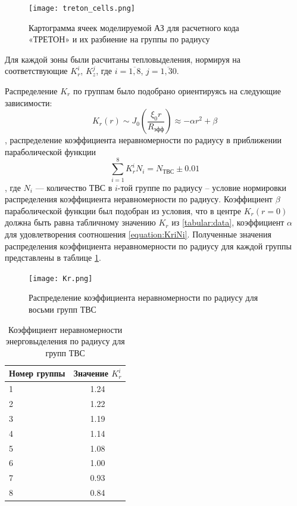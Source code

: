 \begin{figure}[H]
	\begin{center}
		\texttt{[image: treton\_cells.png]}
		\caption{Картограмма ячеек моделируемой АЗ для расчетного кода «ТРЕТОН» и их разбиение на группы по радиусу}
		\label{pic:treton-kartogramma}
	\end{center}
\end{figure}


Для каждой зоны были расчитаны тепловыделения, нормируя на соответствующие $K_r^i$, $K_z^j$, где $i = \overline{1, 8}$, $j = \overline {1, 30}$.

Распределение $K_r$ по группам было подобрано ориентируясь на следующие зависимости:
\begin{equation}
    K_r(r) \sim J_0(\frac{\xi_0 r}{R_{\text{эфф}}}) \approx - \alpha r^2 + \beta
\end{equation}, распределение коэффициента неравномерности по радиусу в приближении параболической функции
\begin{equation}
    \label{equation:KriNi}
    \sum_{i=1}^{8} K_r^i N_i = N_{\text{ТВС}} \pm 0.01
\end{equation}, где $N_i$ — количество ТВС в $i$-той группе по радиусу – условие нормировки распределения коэффициента неравномерности по радиусу.
Коэффициент $\beta$ параболической функции был подобран из условия, что в центре $K_r(r=0)$ должна быть равна табличному значению $K_r$ из \ref{tabular:data}, коэффициент $\alpha$ для удовлетворения соотношения \ref{equation:KriNi}. Полученные значения распределения коэффициента неравномерности по радиусу для каждой группы представлены в таблице \ref{tabular:Kri}.

\begin{figure}[H]
	\begin{center}
		\texttt{[image: Kr.png]}
		\caption{Распределение коэффициента неравномерности по радиусу для восьми групп ТВС}
		\label{pic:Kr}
	\end{center}
\end{figure}

\begin{table}[H]
	\caption{Коэффициент неравномерности энерговыделения по радиусу для групп ТВС}
	\begin{center}
        \begin{tabular}{|l|c|}
        \toprule
         Номер группы & Значение $K_r^i$ \\
         \midrule
         \hline
         1 & 1.24 \\
         \hline
         2 & 1.22 \\
         \hline
         3 & 1.19 \\
         \hline
         4 & 1.14 \\
         \hline
         5 & 1.08 \\
         \hline
         6 & 1.00 \\
         \hline
         7 & 0.93 \\
         \hline
         8 & 0.84 \\
         \bottomrule
		\end{tabular}
		\label{tabular:Kri}
	\end{center}
\end{table}


